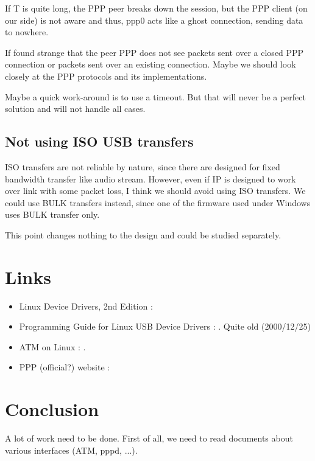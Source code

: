 \documentclass[a4paper,12pt]{article}
\begin{document}
If T is quite long, the PPP peer breaks down the session, but the PPP
client (on our side) is not aware and thus, ppp0 acts like a ghost
connection, sending data to nowhere.

If found strange that the peer PPP does not see packets sent over a
closed PPP connection or packets sent over an existing connection.
Maybe we should look closely at the PPP protocols and its
implementations.

Maybe a quick work-around is to use a timeout. But that will never be
a perfect solution and will not handle all cases.

\subsection{Not using ISO USB transfers}

ISO transfers are not reliable by nature, since there are designed for fixed
bandwidth transfer like audio stream. However, even if IP is designed
to work over link with some packet loss, I think we should avoid using
ISO transfers. We could use BULK transfers instead, since one of the
firmware used under Windows uses BULK transfer only.

This point changes nothing to the design and could be studied separately.

\section{Links}

\begin{itemize}
  
\item Linux Device Drivers, 2nd Edition :

\item Programming Guide for Linux USB Device Drivers :
  .
  Quite old (2000/12/25)
  
\item ATM on Linux :
  .
  
\item PPP (official?) website :
  
\end{itemize}

\section{Conclusion}

A lot of work need to be done. First of all, we need to read documents
about various interfaces (ATM, pppd, ...).
\end{document}
